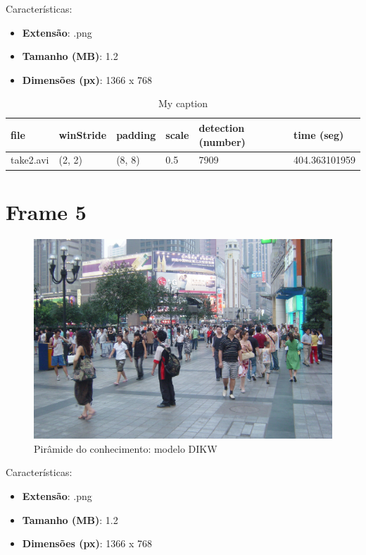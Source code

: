 Características: 
\begin{itemize}
	\item \textbf{Extensão}: .png
	\item \textbf{Tamanho (MB)}: 1.2
	\item \textbf{Dimensões (px)}: 1366 x 768
\end{itemize}


\begin{table}[h]
	\centering
	\begin{tabular}{|l|l|l|l|l|l|}
		\hline
		\textbf{file} & \textbf{winStride} & \textbf{padding} & \textbf{scale} & \textbf{detection (number)} & \textbf{time (seg)} \\ \hline
		take2.avi & (2, 2) & (8, 8) & 0.5 & 7909 & 404.363101959 \\ \hline
		
		
	\end{tabular}
	\caption{My caption}
	\label{my-label}
\end{table}


\section{Frame 5}


\begin{figure}[!htb]
	\centering
	\includegraphics[scale=0.25]{img/vision/frame5.JPG}
	\caption{Pirâmide do conhecimento: modelo DIKW}
	\label{db}
\end{figure}

Características: 
\begin{itemize}
	\item \textbf{Extensão}: .png
	\item \textbf{Tamanho (MB)}: 1.2
	\item \textbf{Dimensões (px)}: 1366 x 768
\end{itemize}

